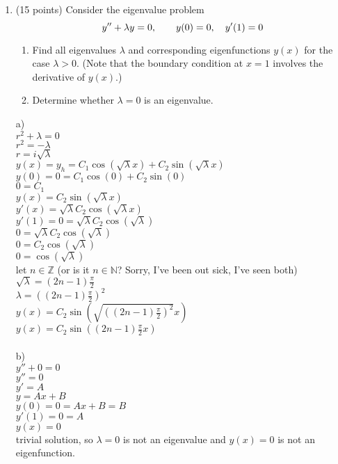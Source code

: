 \documentclass{article}
\begin{document}
\begin{enumerate}
\bigskip
\item (15 points)  Consider the eigenvalue problem
\[
y\sp{\prime\prime}+\lambda y=0,\qquad y(0)=0,\quad y\sp\prime(1)=0
\]
\begin{enumerate}
\item
Find all eigenvalues $\lambda$ and corresponding eigenfunctions $y(x)$ for the case $\lambda>0$.  (Note that the boundary condition at $x=1$ involves the derivative of $y(x)$.)
\item
Determine whether $\lambda=0$ is an eigenvalue.
\end{enumerate}
a)
\\$r^2+\lambda=0$
\\$r^2=-\lambda$
\\$r=i\sqrt{\lambda}$
\\$y(x)=y_h=C_1\cos(\sqrt{\lambda}x)+C_2\sin(\sqrt{\lambda}x)$
\\$y(0)=0=C_1\cos(0)+C_2\sin(0)$
\\$0=C_1$
\\$y(x)=C_2\sin(\sqrt{\lambda}x)$
\\$y'(x)=\sqrt{\lambda}C_2\cos(\sqrt{\lambda}x)$
\\$y'(1)=0=\sqrt{\lambda}C_2\cos(\sqrt{\lambda})$
\\$0=\sqrt{\lambda}C_2\cos(\sqrt{\lambda})$
\\$0=C_2\cos(\sqrt{\lambda})$
\\$0=\cos(\sqrt{\lambda})$
\\let $n\in\mathbb{Z}$ (or is it $n\in\mathbb{N}$? Sorry, I've been out sick, I've seen both)
\\$\sqrt{\lambda}=(2n-1)\frac{\pi}{2}$
\\$\lambda=((2n-1)\frac{\pi}{2})^2$
\\$y(x)=C_2\sin(\sqrt{((2n-1)\frac{\pi}{2})^2}x)$
\\$y(x)=C_2\sin((2n-1)\frac{\pi}{2}x)$
\\
\\b)
\\$y''+0=0$
\\$y''=0$
\\$y'=A$
\\$y=Ax+B$
\\$y(0)=0=Ax+B=B$
\\$y'(1)=0=A$
\\$y(x)=0$
\\trivial solution, so $\lambda=0$ is not an eigenvalue and $y(x)=0$ is not an eigenfunction.



\end{enumerate}
\end{document}
